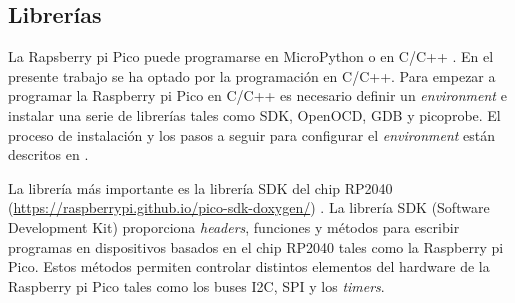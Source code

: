 \documentclass[a4paper,12pt]{book}
\begin{document}




\subsection{Librerías}

La Rapsberry pi Pico puede programarse en MicroPython \cite{micropython-raspberrypiPico} o en C/C++ \cite{c/c++-raspberrypiPicot}. En el presente trabajo se ha optado por la programación en C/C++. Para empezar a programar la Raspberry pi Pico en C/C++ es necesario definir un \emph{environment} e instalar una serie de librerías tales como SDK, OpenOCD, GDB y picoprobe. El proceso de instalación y los pasos a seguir para configurar el \emph{environment} están descritos en \cite{c/c++-raspberrypiPicot}.


La librería más importante es la librería SDK del chip RP2040 (\url{https://raspberrypi.github.io/pico-sdk-doxygen/}) \cite{c/c++-raspberrypiPicot, sdk-raspberrypiPico}. La librería SDK (Software Development Kit) proporciona \emph{headers}, funciones y métodos para escribir programas en dispositivos basados en el chip RP2040 tales como la Raspberry pi Pico. Estos métodos permiten controlar distintos elementos del hardware de la Raspberry pi Pico tales como los buses I2C, SPI y los \emph{timers}.
\end{document}
